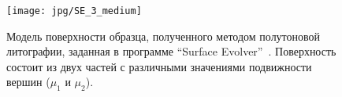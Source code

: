 \begin{figure}[t]
	\begin{center}
		\texttt{[image: jpg/SE\_3\_medium]}
		\vspace{1em}
		\caption{Модель поверхности образца, полученного методом полутоновой литографии, заданная в программе ``Surface Evolver''~\cite{Kirchner_reflow}. Поверхность состоит из двух частей с различными значениями подвижности вершин ($\mu_1$ и $\mu_2$).}
		\label{fig:SE_3}
	\end{center}
\end{figure}
